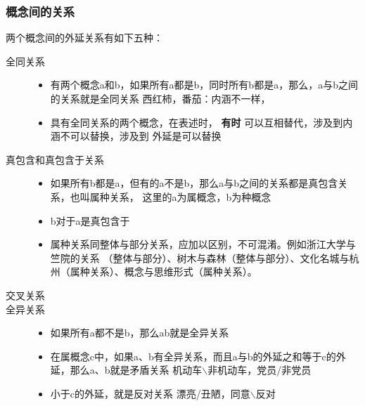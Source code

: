 \documentclass[11pt]{article}
\begin{document}
\subsubsection{概念间的关系}
\label{sec-3-1-4}
两个概念间的外延关系有如下五种：
\begin{description}
\item[{全同关系}] \begin{itemize}
\item 有两个概念a和b，如果所有a都是b，同时所有b都是a，那么，a与b之间的关系就是全同关系
西红柿，番茄：内涵不一样，
\item 具有全同关系的两个概念，在表述时， \textbf{有时} 可以互相替代，涉及到内涵不可以替换，涉及到
外延是可以替换
\end{itemize}
\item[{真包含和真包含于关系}] \begin{itemize}
\item 如果所有b都是a，但有的a不是b，那么a与b之间的关系都是真包含关系，也叫属种关系，
这里的a为属概念，b为种概念
\item b对于a是真包含于
\item 属种关系同整体与部分关系，应加以区别，不可混淆。例如浙江大学与竺院的关系
（整体与部分）、树木与森林（整体与部分）、文化名城与杭州（属种关系）、概念与思维形式（属种关系）。
\end{itemize}
\item[{交叉关系}]
\item[{全异关系}] \begin{itemize}
\item 如果所有a都不是b，那么ab就是全异关系
\item 在属概念c中，如果a、b有全异关系，而且a与b的外延之和等于c的外延，那么a、b就是矛盾关系
机动车$\backslash$非机动车，党员/非党员
\item 小于c的外延，就是反对关系
漂亮/丑陋，同意$\backslash$反对
\end{itemize}
\end{description}
\end{document}
